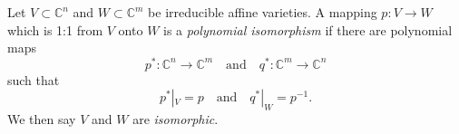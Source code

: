 Let $V \subset \mathbb{C}^n$ and $W \subset \mathbb{C}^m$ be irreducible affine varieties. A mapping $p: V \to W$ which is 1:1 from $V$ onto $W$ is a \emph{polynomial isomorphism} if there are polynomial maps
$$
p^*: \mathbb{C}^n \to \mathbb{C}^m \quad \text{and} \quad q^*: \mathbb{C}^m \to \mathbb{C}^n
$$
such that
$$
p^*|_V = p \quad \text{and} \quad q^*|_W = p^{-1}.
$$
We then say $V$ and $W$ are \emph{isomorphic}.
